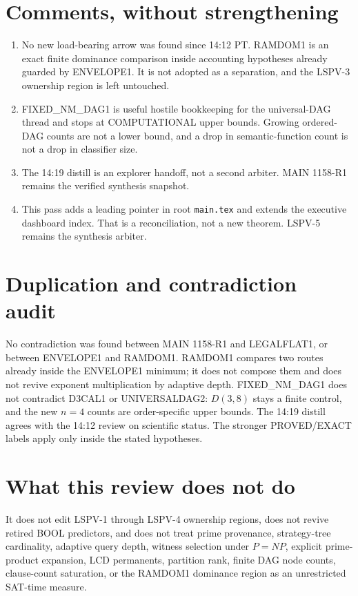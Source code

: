 \documentclass[11pt]{article}
\begin{document}
\section*{Comments, without strengthening}
\begin{enumerate}
\item No new load-bearing arrow was found since 14:12 PT. RAMDOM1 is an exact finite
dominance comparison inside accounting hypotheses already guarded by ENVELOPE1. It is not
adopted as a separation, and the LSPV-3 ownership region is left untouched.
\item FIXED\_NM\_DAG1 is useful hostile bookkeeping for the universal-DAG thread and
stops at COMPUTATIONAL upper bounds. Growing ordered-DAG counts are not a lower bound,
and a drop in semantic-function count is not a drop in classifier size.
\item The 14:19 distill is an explorer handoff, not a second arbiter. MAIN 1158-R1 remains
the verified synthesis snapshot.
\item This pass adds a leading pointer in root \texttt{main.tex} and extends the executive
dashboard index. That is a reconciliation, not a new theorem. LSPV-5 remains the synthesis
arbiter.
\end{enumerate}

\section*{Duplication and contradiction audit}
No contradiction was found between MAIN 1158-R1 and LEGALFLAT1, or between ENVELOPE1 and
RAMDOM1. RAMDOM1 compares two routes already inside the ENVELOPE1 minimum; it does not
compose them and does not revive exponent multiplication by adaptive depth. FIXED\_NM\_DAG1
does not contradict D3CAL1 or UNIVERSALDAG2: \(D(3,8)\) stays a finite control, and the
new \(n=4\) counts are order-specific upper bounds. The 14:19 distill agrees with the
14:12 review on scientific status. The stronger PROVED/EXACT labels apply only inside the
stated hypotheses.

\section*{What this review does not do}
It does not edit LSPV-1 through LSPV-4 ownership regions, does not revive retired BOOL
predictors, and does not treat prime provenance, strategy-tree cardinality, adaptive query
depth, witness selection under \(P=NP\), explicit prime-product expansion, LCD permanents,
partition rank, finite DAG node counts, clause-count saturation, or the RAMDOM1 dominance
region as an unrestricted SAT-time measure.
\end{document}
